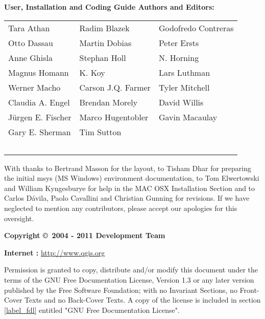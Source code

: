 \begin{flushleft}
\textbf{User, Installation and Coding Guide Authors and Editors:}
  \par\bigskip\noindent
\begin{tabular}{p{4cm} p{4cm} p{4cm}}
Tara Athan & Radim Blazek & Godofredo Contreras \\
Otto Dassau & Martin Dobias & Peter Ersts \\
Anne Ghisla & Stephan Holl & N. Horning \\
Magnus Homann & K. Koy & Lars Luthman \\ 
Werner Macho & Carson J.Q. Farmer & Tyler Mitchell \\
Claudia A. Engel & Brendan Morely & David Willis \\
Jürgen E. Fischer & Marco Hugentobler & Gavin Macaulay \\
Gary E. Sherman & Tim Sutton \\ \
\end{tabular}
\end{flushleft}

With thanks to Bertrand Masson for the layout, to Tisham Dhar for preparing the initial msys (MS Windows)
environment documentation, to Tom Elwertowski and William Kyngesburye for
help in the MAC OSX Installation Section and to Carlos Dávila, Paolo
Cavallini and Christian Gunning for revisions. If we have neglected to 
mention any contributors, please accept our apologies for this oversight.
\par\bigskip\noindent
\textbf{Copyright \copyright~2004 - 2011 \QG Development Team}
\par\bigskip\noindent
\textbf{Internet :} \url{http://www.qgis.org}


Permission is granted to copy, distribute and/or modify this document under 
the terms of the GNU Free Documentation License, Version 1.3 or any later 
version published by the Free Software Foundation; with no Invariant 
Sections, no Front-Cover Texts and no Back-Cover Texts.  A copy of the 
license is included in section \ref{label_fdl} entitled "GNU Free Documentation 
License".

\newpage
